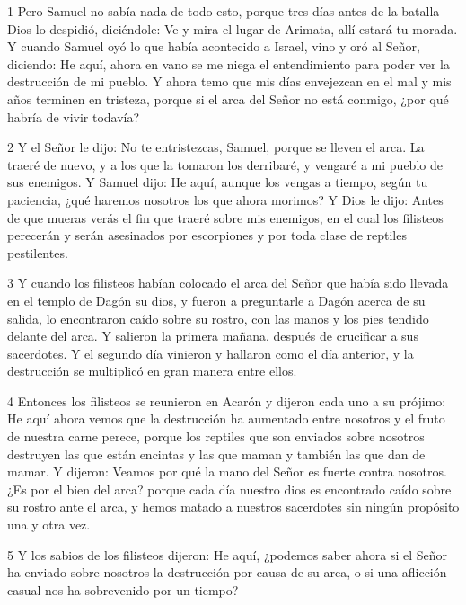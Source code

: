 \par 1 Pero Samuel no sabía nada de todo esto, porque tres días antes de la batalla Dios lo despidió, diciéndole: Ve y mira el lugar de Arimata, allí estará tu morada. Y cuando Samuel oyó lo que había acontecido a Israel, vino y oró al Señor, diciendo: He aquí, ahora en vano se me niega el entendimiento para poder ver la destrucción de mi pueblo. Y ahora temo que mis días envejezcan en el mal y mis años terminen en tristeza, porque si el arca del Señor no está conmigo, ¿por qué habría de vivir todavía?

\par 2 Y el Señor le dijo: No te entristezcas, Samuel, porque se lleven el arca. La traeré de nuevo, y a los que la tomaron los derribaré, y vengaré a mi pueblo de sus enemigos. Y Samuel dijo: He aquí, aunque los vengas a tiempo, según tu paciencia, ¿qué haremos nosotros los que ahora morimos? Y Dios le dijo: Antes de que mueras verás el fin que traeré sobre mis enemigos, en el cual los filisteos perecerán y serán asesinados por escorpiones y por toda clase de reptiles pestilentes.

\par 3 Y cuando los filisteos habían colocado el arca del Señor que había sido llevada en el templo de Dagón su dios, y fueron a preguntarle a Dagón acerca de su salida, lo encontraron caído sobre su rostro, con las manos y los pies tendido delante del arca. Y salieron la primera mañana, después de crucificar a sus sacerdotes. Y el segundo día vinieron y hallaron como el día anterior, y la destrucción se multiplicó en gran manera entre ellos.

\par 4 Entonces los filisteos se reunieron en Acarón y dijeron cada uno a su prójimo: He aquí ahora vemos que la destrucción ha aumentado entre nosotros y el fruto de nuestra carne perece, porque los reptiles que son enviados sobre nosotros destruyen las que están encintas y las que maman y también las que dan de mamar. Y dijeron: Veamos por qué la mano del Señor es fuerte contra nosotros. ¿Es por el bien del arca? porque cada día nuestro dios es encontrado caído sobre su rostro ante el arca, y hemos matado a nuestros sacerdotes sin ningún propósito una y otra vez.

\par 5 Y los sabios de los filisteos dijeron: He aquí, ¿podemos saber ahora si el Señor ha enviado sobre nosotros la destrucción por causa de su arca, o si una aflicción casual nos ha sobrevenido por un tiempo?

